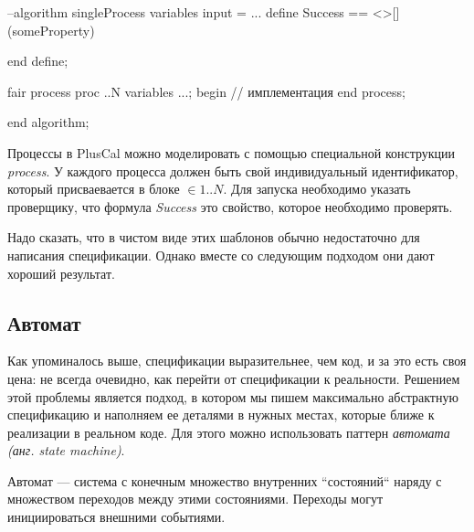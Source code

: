 \documentclass[14pt, openany]{report}
\begin{document}
\begin{ppcal}
  --algorithm singleProcess
    variables
      input = ...
    define
      Success == <>[](someProperty)
      
    end define;

    fair process proc ..N
    variables ...;
    begin
      \* // имплементация
    end process;

    end algorithm;
\end{ppcal}
\begin{tlatex}
%
%
%
%
%
\@pvspace{8.0pt}%
%
\@pvspace{8.0pt}%
%
%
%
%
%
\@xx{}%
%
\@pvspace{8.0pt}%
%
\end{tlatex}

Процессы в PlusCal можно моделировать с помощью специальной конструкции \emph{process}. У каждого процесса должен быть свой индивидуальный идентификатор, который присваевается в блоке \(\in 1..N\). Для запуска необходимо указать проверщику, что формула \emph{Success} это свойство, которое необходимо проверять.

Надо сказать, что в чистом виде этих шаблонов обычно недостаточно для написания спецификации. Однако вместе со следующим подходом они дают хороший результат.

\subsection{Автомат}
Как упоминалось выше, спецификации выразительнее, чем код, и за это есть своя цена: не всегда очевидно, как перейти от спецификации к реальности. Решением этой проблемы является подход, в котором мы пишем максимально абстрактную спецификацию и наполняем ее деталями в нужных местах, которые ближе к реализации в реальном коде. Для этого можно использовать паттерн \emph{автомата (анг. state machine)}.

Автомат --- система с конечным множество внутренних ``состояний`` наряду с множеством переходов между этими состояниями. Переходы могут инициироваться внешними событиями. 
\end{document}
